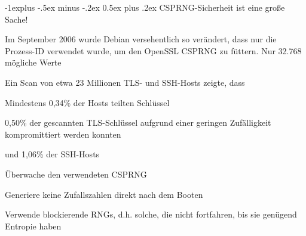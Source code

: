 \documentclass[a4paper]{article}
\makeatletter
\renewcommand{\subsection}{\@startsection{subsection}{2}{0mm}%
 {-1explus -.5ex minus -.2ex}%
 {0.5ex plus .2ex}%
 {\normalfont\normalsize\bfseries}}
\makeatother
\begin{document}
\begin{multicols}{3}
      \subsection{CSPRNG-Sicherheit ist eine große Sache!}
      \begin{itemize*}
            \item Im September 2006 wurde Debian versehentlich so verändert, dass nur die Prozess-ID verwendet wurde, um den OpenSSL CSPRNG zu füttern. Nur 32.768 mögliche Werte
            \item Ein Scan von etwa 23 Millionen TLS- und SSH-Hosts zeigte, dass
            \begin{itemize*}
                  \item Mindestens 0,34\% der Hosts teilten Schlüssel%
                  \item 0,50\% der gescannten TLS-Schlüssel aufgrund einer geringen Zufälligkeit kompromittiert werden konnten
                  \item und 1,06\% der SSH-Hosts
            \end{itemize*}
            \item Überwache den verwendeten CSPRNG
            \item Generiere keine Zufallszahlen direkt nach dem Booten%
            \item Verwende blockierende RNGs, d.h. solche, die nicht fortfahren, bis sie genügend Entropie haben
      \end{itemize*}

      \pagebreak

\end{multicols}
\end{document}

